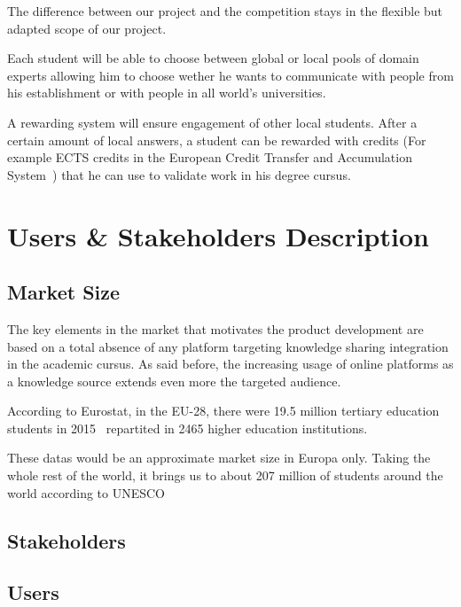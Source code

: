\documentclass[12pt,a4paper,oneside, titlepage]{article}
\begin{document}
		The difference between our project and the competition stays in the flexible but adapted scope of our 
		project. \newline 
		
		Each student will be able to choose between global or local pools of domain experts allowing him to 
		choose wether he wants to communicate with people from his establishment or with people in all world's 
		universities. \newline
		
		A rewarding system will ensure engagement of other local students. After a certain amount 
		of local answers, a student can be rewarded with credits (For example ECTS credits in the European 
		Credit Transfer and Accumulation System~\cite{ectsWiki}) that he 
		can use to validate work in his degree cursus. 
		
    \newpage
	\section{Users \& Stakeholders Description}
	\subsection{Market Size}
	The key elements in the market that motivates the product development are based on a total absence of any platform 
	targeting knowledge sharing integration in the academic cursus. As said before, the increasing usage of online
	platforms as a knowledge source extends even more the targeted audience. \newline
	
	According to Eurostat, in the EU-28, there were 19.5 million tertiary education students in 
	2015~\cite{tertiaryStudentsEU} repartited in 2465 higher education institutions. \newline
	
	These datas would be an approximate market size in Europa only. Taking the whole rest of the world, it brings us to about 207 million of students 
	around the world according to UNESCO~\cite{higherEducationPaper}
	
	\subsection{Stakeholders}
	\subsection{Users}
\end{document}
